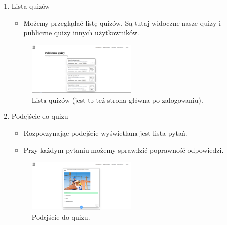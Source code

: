 \documentclass{article}
\begin{document}
\begin{enumerate}
		\item Lista quizów \\
        \begin{minipage}{0.4\textwidth}
          \begin{itemize}
            \item Możemy przeglądać listę quizów. Są tutaj widoczne nasze quizy i publiczne quizy innych użytkowników.
          \end{itemize}
        \end{minipage}
        \begin{minipage}{0.6\textwidth}
          \begin{figure}[H]
            \centering
            \includegraphics[width=0.5\textwidth]{../_assets/web/quizzes.png}
            \caption{Lista quizów (jest to też strona główna po zalogowaniu).}
            \label{fig:quizzes}
          \end{figure}
        \end{minipage}

		\item Podejście do quizu \\
        \begin{minipage}{0.4\textwidth}
          \begin{itemize}
            \item Rozpoczynając podejście wyświetlana jest lista pytań.
            \item Przy każdym pytaniu możemy sprawdzić poprawność odpowiedzi.
          \end{itemize}
        \end{minipage}
        \begin{minipage}{0.6\textwidth}
          \begin{figure}[H]
            \centering
            \includegraphics[width=0.5\textwidth]{../_assets/web/attempt.png}
            \caption{Podejście do quizu.}
            \label{fig:attempt}
          \end{figure}
        \end{minipage}


\end{enumerate}
\end{document}
